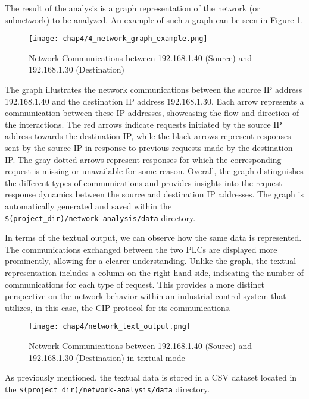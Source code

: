 The result of the analysis is a graph representation of the network (or subnetwork) to be analyzed. An example of such a graph can be seen in Figure \ref{fig:4_network_graph_example}. 

\begin{figure}[ht]
	\centering
	\texttt{[image: chap4/4\_network\_graph\_example.png]}
	\caption{Network Communications between 192.168.1.40 (Source) and 192.168.1.30 (Destination)}
	\label{fig:4_network_graph_example}
\end{figure}

The graph illustrates the network communications between the source IP address 192.168.1.40 and the destination IP address 192.168.1.30. Each arrow represents a communication between these IP addresses, showcasing the flow and direction of the interactions. The red arrows indicate requests initiated by the source IP address towards the destination IP, while the black arrows represent responses sent by the source IP in response to previous requests made by the destination IP. The gray dotted arrows represent responses for which the corresponding request is missing or unavailable for some reason. Overall, the graph distinguishes the different types of communications and provides insights into the request-response dynamics between the source and destination IP addresses. The graph is automatically generated and saved within the\\ 
\texttt{\$(project\_dir)/network-analysis/data} directory.

\bigskip
In terms of the textual output, we can observe how the same data is represented. The communications exchanged between the two PLCs are displayed more prominently, allowing for a clearer understanding. Unlike the graph, the textual representation includes a column on the right-hand side, indicating the number of communications for each type of request. This provides a more distinct perspective on the network behavior within an industrial control system that utilizes, in this case, the CIP protocol for its communications.

\begin{figure}[ht]
	\centering
	\texttt{[image: chap4/network\_text\_output.png]}
	\caption{Network Communications between 192.168.1.40 (Source) and 192.168.1.30 (Destination) in textual mode}
	\label{fig:4_network_textual_example}
\end{figure}

As previously mentioned, the textual data is stored in a CSV dataset located in the \texttt{\$(project\_dir)/network-analysis/data} directory.

